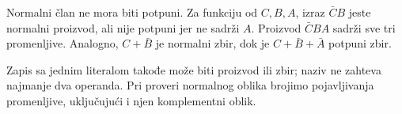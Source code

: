 Normalni član ne mora biti potpuni. Za funkciju od \(C,B,A\), izraz \(\bar CB\) jeste normalni proizvod, ali nije potpuni jer ne sadrži \(A\). Proizvod \(\bar CBA\) sadrži sve tri promenljive. Analogno, \(C+\bar B\) je normalni zbir, dok je \(C+\bar B+\bar A\) potpuni zbir.

Zapis sa jednim literalom takođe može biti proizvod ili zbir; naziv ne zahteva najmanje dva operanda. Pri proveri normalnog oblika brojimo pojavljivanja promenljive, uključujući i njen komplementni oblik.
